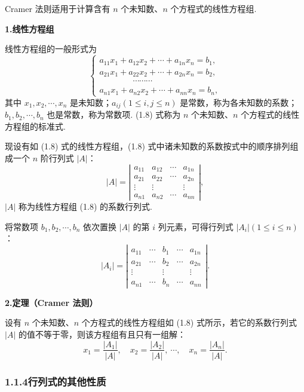 \documentclass[UTF8,12pt,a4paper,fontset=fandol]{ctexart}
\begin{document}
Cramer 法则适用于计算含有 $n$ 个未知数、$n$ 个方程式的线性方程组.

\noindent\textbf{1.\quad 线性方程组}

线性方程组的一般形式为
\begin{equation}
\left\{
\begin{array}{l}
a_{11}x_1+a_{12}x_2+\cdots+a_{1n}x_n=b_1,\\
a_{21}x_1+a_{22}x_2+\cdots+a_{2n}x_n=b_2,\\
\hspace{4em}\cdots\cdots\cdots\\
a_{n1}x_1+a_{n2}x_2+\cdots+a_{nn}x_n=b_n,
\end{array}
\right.
\tag{1.8}
\end{equation}
其中 $x_1,x_2,\cdots,x_n$ 是未知数；$a_{ij}(1\le i,j\le n)$ 是常数，称为各未知数的系数；$b_1,b_2,\cdots,b_n$ 也是常数，称为常数项. (1.8) 式称为 $n$ 个未知数、$n$ 个方程式的线性方程组的标准式.

现设有如 (1.8) 式的线性方程组，(1.8) 式中诸未知数的系数按式中的顺序排列组成一个 $n$ 阶行列式 $|A|$：
\[
|A|=
\left|\begin{array}{cccc}
a_{11} & a_{12} & \cdots & a_{1n}\\
a_{21} & a_{22} & \cdots & a_{2n}\\
\vdots & \vdots &        & \vdots\\
a_{n1} & a_{n2} & \cdots & a_{nn}
\end{array}\right|,
\]
$|A|$ 称为线性方程组 (1.8) 的系数行列式.

将常数项 $b_1,b_2,\cdots,b_n$ 依次置换 $|A|$ 的第 $i$ 列元素，可得行列式 $|A_i|(1\le i\le n)$：
\[
|A_i|=
\left|\begin{array}{ccccc}
a_{11} & \cdots & b_1 & \cdots & a_{1n}\\
a_{21} & \cdots & b_2 & \cdots & a_{2n}\\
\vdots &        & \vdots &        & \vdots\\
a_{n1} & \cdots & b_n & \cdots & a_{nn}
\end{array}\right|.
\]

\noindent\textbf{2.\quad 定理（Cramer 法则）}

设有 $n$ 个未知数、$n$ 个方程式的线性方程组如 (1.8) 式所示，若它的系数行列式 $|A|$ 的值不等于零，则该方程组有且只有一组解：
\[
x_1=\frac{|A_1|}{|A|},\quad x_2=\frac{|A_2|}{|A|},\ \cdots,\quad
x_n=\frac{|A_n|}{|A|}.
\]

\subsubsection*{1.1.4\quad 行列式的其他性质}
\end{document}
